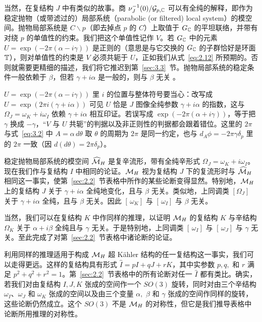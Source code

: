 \bigskip{}

当然，在复结构 $J$ 中有类似的故事。商 $\nu_J^{-1}(0)/\mathcal{G}_{p,{\mathbb{C}}}$ 可以有全纯的解释，即作为稳定抛物（或带滤过的）局部系统（parabolic (or filtered) local system）的模空间。抛物局部系统是 $C\backslash p$（即去掉点 $p$ 的 $C$）上取值于 $G_{{\mathbb{C}}}$ 的平坦联络，并带有对绕 $p$ 的单值性的约束。我们把这个单值性记作 $V$。若 $G_{\mathbb{C}}$ 中的元素 $U=\exp(-2\pi(\alpha-i\gamma))$ 是正则的（意思是与它交换的 $G_{\mathbb{C}}$ 的子群恰好是环面 ${\mathbb{T}}$），则对单值性的约束是 $V$ 必须共轭于 $U$，正如我们从式~\eqref{eq:2.12} 所预期的。否则就需要更精细的描述，我们将它推迟到第~\ref{sec:3.3}~节。抛物局部系统的稳定条件一般依赖于 $\beta$，但若 $\gamma+i\alpha$ 是一般的，则与 $\beta$ 无关 \cite{ref24}。

\begin{yizhu}[易错点]
$U=\exp(-2\pi(\alpha-i\gamma))$ 里 $i$ 的位置与整体符号要当心：改写成 $U=\exp(2\pi i(\gamma+i\alpha))$ 可见 $U$ 恰是 $J$ 图像全纯参数 $\gamma+i\alpha$ 的指数，这与 $\Omega_J=\omega_K+i\omega_I$ 依赖 $\gamma+i\alpha$ 相互印证。若误写成 $\exp(-2\pi(\alpha+i\gamma))$，等于把 $\gamma$ 换成 $-\gamma$，“$V$ 与 $U$ 共轭”的判据以及非正则性的判据都会跟着错位。这里的 $2\pi$ 与式~\eqref{eq:3.2} 中 $A=\alpha\,d\theta$ 取 $\theta$ 的周期为 $2\pi$ 是同一约定，也与 $d_A\phi=-2\pi\gamma\delta_p$ 里的 $2\pi$ 一致（因 $d(d\theta)=2\pi\delta_p$）。
\end{yizhu}

稳定抛物局部系统的模空间 $\widehat {{\mathcal{M}}}_H$ 是复辛流形，带有全纯辛形式
$\Omega_J=\omega_K+i\omega_I$。现在我们作与复结构 $I$ 中相同的论证。${{\mathcal{M}}_H}$ 视为复结构 $J$ 下的复流形时与 $\widehat {{\mathcal{M}}}_H$ 相同这一事实，使第~\ref{sec:2.2}~节表格中所作的某些论断变得显然。特别地，${{\mathcal{M}}_H}$ 上的复结构 $J$ 关于 $\gamma+i\alpha$ 全纯地变化，且与 $\beta$ 无关。类似地，上同调类 $[\Omega_J]$ 关于 $\gamma+i\alpha$ 全纯，且与 $\beta$ 无关。因此 $[\,\omega_K]$ 与 $[\,\omega_I]$ 与 $\beta$ 无关。


当然，我们可以在复结构 $K$ 中作同样的推理，以证明 ${{\mathcal{M}}_H}$ 的复结构 $K$ 与辛结构 $\Omega_K$ 关于 $\alpha+i\beta$ 全纯且与 $\gamma$ 无关。于是特别地，上同调类 $[\,\omega_I]$ 与 $[\,\omega_J]$ 与 $\gamma$ 无关。至此完成了对第~\ref{sec:2.2}~节表格中诸论断的论证。




\bigskip{}

利用同样的推理适用于构成 ${{\mathcal{M}}_H}$ 超 Kähler 结构的任一复结构这一事实，我们可以走得更远。这样的复结构具有形式 $\hat I=pI+qJ+rK$，其中实参数 $p,q,$ 和 $r$ 满足
$p^2+q^2+r^2=1$。第~\ref{sec:2.2}~节表格中的所有论断对任一 $\hat I$ 都有类比。确实，若我们对由复结构 $I,J,K$ 张成的空间作一个 $SO(3)$ 旋转，同时对由三个辛结构 $\omega_I$、$\omega_J$ 和 $\omega_K$ 张成的空间以及由三个变量 $\alpha,$ $\beta$ 和 $\gamma$ 张成的空间作同样的旋转，这些论断仍然成立。这个 $SO(3)$ 不是 ${{\mathcal{M}}_H}$ 的对称性，但它是我们推导表格中论断所用推理的对称性。

